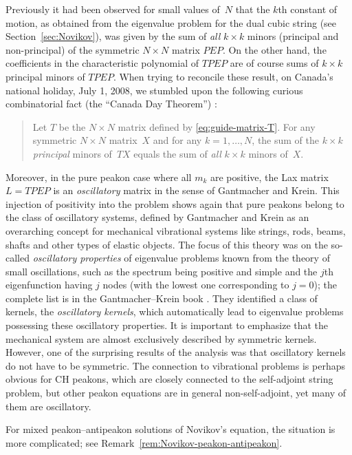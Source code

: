 \documentclass[10pt,a4paper]{article} \pdfoutput=1 
\begin{document}
Previously it had been observed for small values of~$N$ that the $k$th constant of motion,
as obtained from the eigenvalue problem for the dual cubic string (see Section~\ref{sec:Novikov}),
was given by the sum of \emph{all} $k \times k$ minors (principal and non-principal) of the symmetric
$N \times N$ matrix $PEP$.
On the other hand, the coefficients in the characteristic polynomial of $TPEP$ are of course sums
of $k \times k$ principal minors of $TPEP$.
When trying to reconcile these result, on Canada's national holiday, July 1, 2008,
we stumbled upon the following curious combinatorial fact (the ``Canada Day Theorem'')
\cite{hone-lundmark-szmigielski:2009:novikov,gomez-lundmark-szmigielski:2013:CDT}:
\begin{quote}
  Let $T$ be the $N \times N$ matrix defined by \eqref{eq:guide-matrix-T}.
  For any symmetric $N \times N$ matrix~$X$
  and for any $k = 1, \dots, N$,
  the sum of the $k \times k$ \emph{principal} minors of~$TX$
  equals the sum of \emph{all} $k \times k$ minors of~$X$.
\end{quote}
Moreover, in the pure peakon case where all $m_k$ are positive, the Lax matrix $L = TPEP$ is an
\emph{oscillatory} matrix in the sense of Gantmacher and Krein.
This injection of positivity into the problem shows again that pure peakons belong to the class of
oscillatory systems,
defined by Gantmacher and Krein as an overarching concept for
mechanical vibrational systems like strings, rods, beams, shafts
and other types of elastic objects.
The focus of this theory was on the so-called \emph{oscillatory properties}
of eigenvalue problems known from the theory of small oscillations,
such as the spectrum being positive and simple and
the $j$th eigenfunction having $j$ nodes (with the lowest one corresponding to $j=0$);
the complete list is in the Gantmacher--Krein book \cite[p.~2]{gantmacher-krein:2002:oscillation-matrices}.
They identified a class of kernels, the \emph{oscillatory kernels},
which automatically lead to eigenvalue problems possessing these oscillatory properties.
It is important to emphasize that the mechanical system are almost exclusively described
by symmetric kernels. However, one of the surprising results of the analysis was that
oscillatory kernels do not have to be symmetric.  
The connection to vibrational problems is perhaps obvious for CH peakons,
which are closely connected to the self-adjoint string problem,
but other peakon equations are in general non-self-adjoint, yet many of them are oscillatory.

For mixed peakon--antipeakon solutions of Novikov's equation, the situation is more complicated;
see Remark~\ref{rem:Novikov-peakon-antipeakon}.
\end{document}

